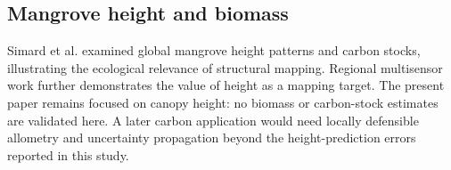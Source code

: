 \subsection{Mangrove height and biomass}

Simard et al. \citep{simard2019} examined global mangrove height patterns and carbon stocks, illustrating the ecological relevance of structural mapping. Regional multisensor work \citep{jia2025,jamaluddin2025} further demonstrates the value of height as a mapping target. The present paper remains focused on canopy height: no biomass or carbon-stock estimates are validated here. A later carbon application would need locally defensible allometry and uncertainty propagation beyond the height-prediction errors reported in this study.
